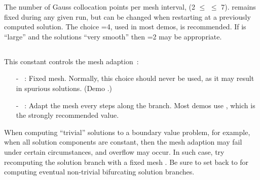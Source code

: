 
 The number of Gauss collocation points per mesh interval,
 (2 $\le$  $\le$ 7).
  remains fixed during any given run, but can be changed
 when restarting at a previously computed solution.
 The choice =4, used in most demos, is recommended.
 If  is ``large'' and the solutions ``very smooth'' then
 =2 may be appropriate.

\subsection{}  \label{sec:IAD}


This constant controls the mesh adaption~: 
\begin{itemize}
\item[-] ~:
  Fixed mesh. Normally, this choice should never be used, as it may result
  in spurious solutions. (Demo .)
\item[-] ~:  
  Adapt the mesh every  steps along the branch.
  Most demos use , which is the strongly recommended value.
\end{itemize}

When computing  ``trivial'' solutions to a boundary value problem,
for example, when all solution components are constant, then the
mesh adaption may fail under certain circumstances, and overflow may
occur. In such case, try recomputing the solution branch with a fixed
mesh . Be sure to set   back to  
for computing eventual non-trivial bifurcating solution branches.
